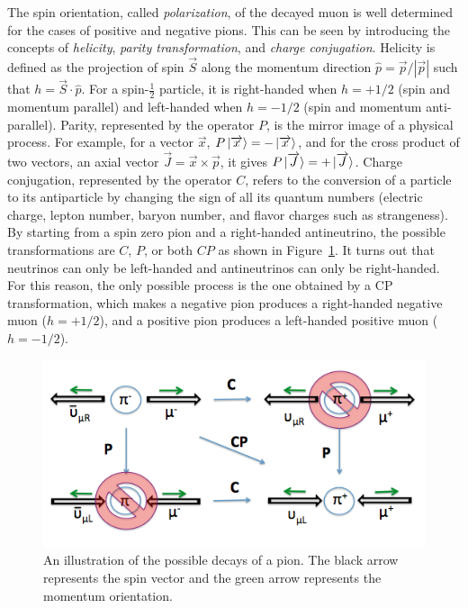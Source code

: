 \documentclass{outhesis}
\begin{document}
The spin orientation, called \emph{polarization},  of the decayed muon is well determined for the cases of positive and negative pions. This can be seen by introducing the concepts of \emph{helicity}, \emph{parity transformation}, and \emph{charge conjugation}. Helicity is defined as the projection of spin $\overrightarrow{S}$ along the momentum direction $\hat{p} = \overrightarrow{p}/|\overrightarrow{p}|$ such that $h = \overrightarrow{S}\cdot \hat{p}$. For a spin-$\frac{1}{2}$ particle, it is right-handed when $h=+1/2$ (spin and momentum parallel) and left-handed when $h=-1/2$ (spin and momentum anti-parallel). Parity, represented by the operator $P$, is the mirror image of a physical process. For example, for a vector $\overrightarrow{x}$, $P\ket{\overrightarrow{x}} = -\ket{\overrightarrow{x}}$, and for the cross product of two vectors, an axial vector $\overrightarrow{J} = \overrightarrow{x} \times \overrightarrow{p}$, it gives $P\ket{\overrightarrow{J}} = +\ket{\overrightarrow{J}} $. Charge conjugation, represented by the operator $C$, refers to the conversion of a particle to its antiparticle by changing the sign of all its quantum numbers (electric charge, lepton number, baryon number, and flavor charges such as strangeness). \\ 
By starting from a spin zero pion and a right-handed antineutrino, the possible transformations are $C$, $P$, or both $CP$ as shown in Figure~\ref{fig:cp}. It turns out that neutrinos can only be left-handed and antineutrinos can only be right-handed. For this reason, the only possible process is the one obtained by a CP transformation, which makes a negative pion produces a right-handed negative muon ($h=+1/2$), and a positive pion produces a left-handed positive muon ($h=-1/2$). 
\begin{figure}
  \centering
  \includegraphics[scale=0.5]{figures/pion_cp}
  \caption{An illustration of the possible decays of a pion. The black arrow represents the spin vector and the green arrow represents the momentum orientation.}
  \label{fig:cp}
\end{figure}
\end{document}
